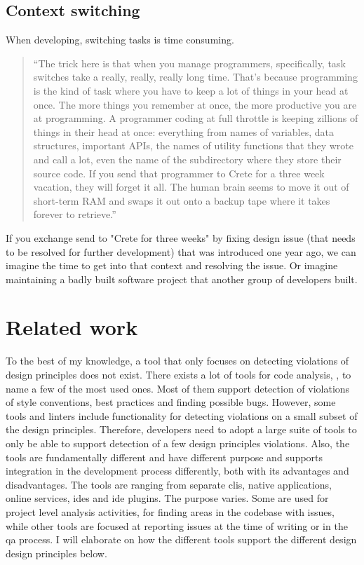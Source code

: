 \documentclass{report}
\begin{document}
\section{Context switching}
When developing, switching tasks is time consuming. 

\begin{quote}
    ``The trick here is that when you manage programmers, specifically, task switches take a really, really, really long time. That’s because programming is the kind of task where you have to keep a lot of things in your head at once. The more things you remember at once, the more productive you are at programming. A programmer coding at full throttle is keeping zillions of things in their head at once: everything from names of variables, data structures, important APIs, the names of utility functions that they wrote and call a lot, even the name of the subdirectory where they store their source code. If you send that programmer to Crete for a three week vacation, they will forget it all. The human brain seems to move it out of short-term RAM and swaps it out onto a backup tape where it takes forever to retrieve.'' \cite{human-context-switching}
\end{quote} 
If you exchange send to "Crete for three weeks" by fixing design issue (that needs to be resolved for further development) that was introduced one year ago, we can imagine the time to get into that context and resolving the issue. Or imagine maintaining a badly built software project that another group of developers built.


\chapter{Related work}
\label{relatedwork}

To the best of my knowledge, a tool that only focuses on detecting violations of design principles does not exist. There exists a lot of tools for code analysis, \cite{}, \cite{} to name a few of the most used ones. Most of them support detection of violations of style conventions, best practices and finding possible bugs. However, some tools and linters include functionality for detecting violations on a small subset of the design principles. Therefore, developers need to adopt a large suite of tools to only be able to support detection of a few design principles violations. Also, the tools are fundamentally different and have different purpose and supports integration in the development process differently, both with its advantages and disadvantages. The tools are ranging from separate \gls{cli}s, native applications, online services, \gls{ide}s and \gls{ide} plugins. The purpose varies. Some are used for project level analysis activities, for finding areas in the codebase with issues, while other tools are focused at reporting issues at the time of writing or in the \gls{qa} process. I will elaborate on how the different tools support the different design design principles below.
\end{document}
